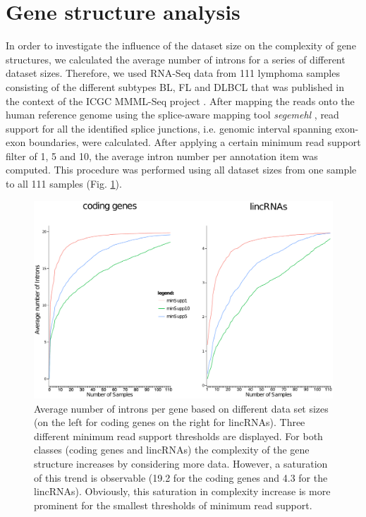 \documentclass[ncrna,article,submit,moreauthors,pdftex,10pt,a4paper]{mdpi}
\begin{document}
\section{Gene structure analysis}
In order to investigate the influence of the dataset size on the complexity of gene structures, we calculated the average number of introns for a series of different dataset sizes.
Therefore, we used RNA-Seq data from 111 lymphoma samples  consisting of the different subtypes BL, FL and DLBCL that was published in the context of the ICGC MMML-Seq project \citep{Richter2012-un}.
After mapping the reads onto the human reference genome using the splice-aware mapping tool \textit{segemehl} \citep{hoffmann2009, hoffmann2014}, read support for all the identified splice junctions, i.e. genomic interval spanning exon-exon boundaries, were calculated. After applying a certain minimum read support filter of 1, 5 and 10, the average intron number per annotation item was computed. This procedure was performed using all dataset sizes from one sample to all 111 samples (Fig. \ref{saturation}).

\begin{figure}[H]
 \centering
 \includegraphics[width=\linewidth]{saturation}
 \caption{
Average number of introns per gene based on different data set sizes (on the left for coding genes on the right for lincRNAs). Three different minimum read support thresholds are displayed.
For both classes (coding genes and lincRNAs) the complexity of the gene structure increases by considering more data. However, a saturation of this trend is observable (19.2 for the coding genes and 4.3 for the lincRNAs). Obviously, this saturation in complexity increase is more prominent for the smallest thresholds of minimum read support.}
 \label{saturation}
\end{figure}
\end{document}
